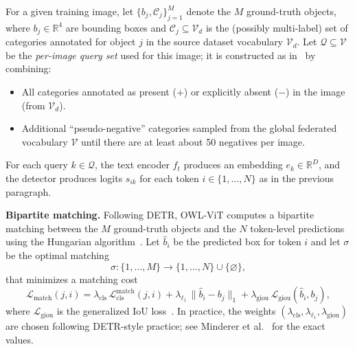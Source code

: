 \begin{enrichment}
\begin{enrichment}[Method][subsection]
		For a given training image, let $\{b_j, \mathcal{C}_j\}_{j=1}^M$ denote the $M$ ground-truth objects, where $b_j \in \mathbb{R}^4$ are bounding boxes and $\mathcal{C}_j \subseteq \mathcal{V}_d$ is the (possibly multi-label) set of categories annotated for object $j$ in the source dataset vocabulary $\mathcal{V}_d$.
		Let $\mathcal{Q} \subseteq \mathcal{V}$ be the \emph{per-image query set} used for this image; it is constructed as in~\cite{minderer2022_owlvit} by combining:
		\begin{itemize}
			\item All categories annotated as present ($+$) or explicitly absent ($-$) in the image (from $\mathcal{V}_d$).  
			\item Additional ``pseudo-negative'' categories sampled from the global federated vocabulary $\mathcal{V}$ until there are at least about 50 negatives per image.  
		\end{itemize}
		For each query $k \in \mathcal{Q}$, the text encoder $f_t$ produces an embedding $e_k \in \mathbb{R}^D$, and the detector produces logits $s_{ik}$ for each token $i \in \{1,\dots,N\}$ as in the previous paragraph.
		
		\medskip
		\noindent\textbf{Bipartite matching.}
		Following DETR, OWL-ViT computes a bipartite matching between the $M$ ground-truth objects and the $N$ token-level predictions using the Hungarian algorithm~\cite{carion2020_detr}.
		Let $\hat{b}_i$ be the predicted box for token $i$ and let $\sigma$ be the optimal matching
		\[
		\sigma : \{1,\dots,M\} \rightarrow \{1,\dots,N\} \cup \{\varnothing\},
		\]
		that minimizes a matching cost
		\[
		\mathcal{L}_{\text{match}}(j,i)
		= \lambda_{\text{cls}}\, \mathcal{L}_\text{cls}^{\text{match}}(j,i)
		+ \lambda_{\ell_1}\, \|\hat{b}_i - b_j\|_1
		+ \lambda_{\text{giou}}\, \mathcal{L}_{\text{giou}}(\hat{b}_i, b_j),
		\]
		where $\mathcal{L}_{\text{giou}}$ is the generalized IoU loss~\cite{rezatofighi2019_giou}.
		In practice, the weights $(\lambda_{\text{cls}},\lambda_{\ell_1},\lambda_{\text{giou}})$ are chosen following DETR-style practice; see Minderer et al.~\cite{minderer2022_owlvit} for the exact values.
		
		\newpage
		

\end{enrichment}
\end{enrichment}
